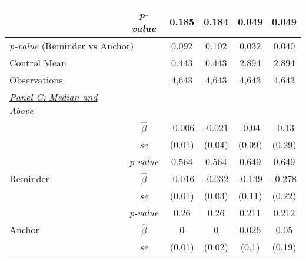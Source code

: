 \begin{tabular}{cccccc}
\multicolumn{1}{l}{} & \multicolumn{1}{c}{\scriptsize{\textit{p-value}}} & \multicolumn{1}{c}{0.185} & \multicolumn{1}{c}{0.184} & \multicolumn{1}{c}{0.049} & \multicolumn{1}{c}{0.049} \\
\midrule
\multicolumn{2}{l}{\textit{p-value} (Reminder vs Anchor)}& \multicolumn{1}{c}{0.092}& \multicolumn{1}{c}{0.102}& \multicolumn{1}{c}{0.032}& \multicolumn{1}{c}{0.040}\\
\multicolumn{2}{l}{Control Mean} &0.443&0.443&2.894&2.894\\
\multicolumn{2}{l}{Observations} &4,643&4,643&4,643&4,643\\
\midrule
\multicolumn{1}{l}{\underline{\textit{Panel C: Median and Above}}} &  &  &  & &\\ 
 \addlinespace
\multicolumn{1}{l}{Any Treatment} & \multicolumn{1}{c}{\scriptsize $\hat{\beta}$} & \multicolumn{1}{c}{-0.006} & \multicolumn{1}{c}{-0.021} & \multicolumn{1}{c}{-0.04} & \multicolumn{1}{c}{-0.13} \\
\multicolumn{1}{l}{} & \multicolumn{1}{c}{\scriptsize{\textit{se}}} & \multicolumn{1}{c}{(0.01)} & \multicolumn{1}{c}{(0.04)} & \multicolumn{1}{c}{(0.09)} & \multicolumn{1}{c}{(0.29)} \\
\multicolumn{1}{l}{} & \multicolumn{1}{c}{\scriptsize{\textit{p-value}}} & \multicolumn{1}{c}{0.564} & \multicolumn{1}{c}{0.564} & \multicolumn{1}{c}{0.649} & \multicolumn{1}{c}{0.649} \\
\multicolumn{1}{l}{Reminder} & \multicolumn{1}{c}{\scriptsize $\hat{\beta}$} & \multicolumn{1}{c}{-0.016} & \multicolumn{1}{c}{-0.032} & \multicolumn{1}{c}{-0.139} & \multicolumn{1}{c}{-0.278} \\
\multicolumn{1}{l}{} & \multicolumn{1}{c}{\scriptsize{\textit{se}}} & \multicolumn{1}{c}{(0.01)} & \multicolumn{1}{c}{(0.03)} & \multicolumn{1}{c}{(0.11)} & \multicolumn{1}{c}{(0.22)} \\
\multicolumn{1}{l}{} & \multicolumn{1}{c}{\scriptsize{\textit{p-value}}} & \multicolumn{1}{c}{0.26} & \multicolumn{1}{c}{0.26} & \multicolumn{1}{c}{0.211} & \multicolumn{1}{c}{0.212} \\
\multicolumn{1}{l}{Anchor} & \multicolumn{1}{c}{\scriptsize $\hat{\beta}$} & \multicolumn{1}{c}{0} & \multicolumn{1}{c}{0} & \multicolumn{1}{c}{0.026} & \multicolumn{1}{c}{0.05} \\
\multicolumn{1}{l}{} & \multicolumn{1}{c}{\scriptsize{\textit{se}}} & \multicolumn{1}{c}{(0.01)} & \multicolumn{1}{c}{(0.02)} & \multicolumn{1}{c}{(0.1)} & \multicolumn{1}{c}{(0.19)} \\

\end{tabular}

